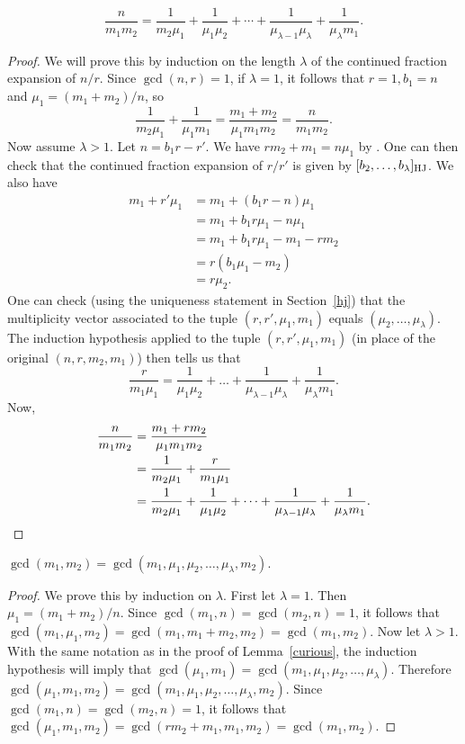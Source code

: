 \begin{lemma}\label{curious}
 \[ \frac{n}{m_1m_2} = \frac{1}{m_2 \mu_1} + \frac{1}{\mu_1 \mu_2} + \cdots + \frac{1}{\mu_{\lambda-1} \mu_\lambda} + \frac{1}{\mu_\lambda m_1} .\]
\end{lemma}
\begin{proof}
 We will prove this by induction on the length $\lambda$ of the continued fraction expansion of $n/r$. Since $\gcd(n,r) = 1$, if $\lambda = 1$, it follows that $r=1, b_1=n$ and $\mu_1 = (m_1+m_2)/n$, so
 \[ \frac{1}{m_2 \mu_1} + \frac{1}{\mu_1 m_1} = \frac{m_1+m_2}{\mu_1 m_1 m_2} = \frac{n}{m_1 m_2} .\]
 Now assume $\lambda > 1$. Let $n=b_1 r - r'$. We have $rm_2+m_1 = n \mu_1$ by \cite[Corollary~2.4.3]{ces}. One can then check that the continued fraction expansion of $r/r'$ is given by $[b_2,\ldots,b_{\lambda}]_{\textup{HJ}}$. 
 We also have 
 \begin{align*}
 m_1+r'\mu_1 &= m_1+(b_1r-n)\mu_1 \\
 &= m_1+b_1r\mu_1-n\mu_1 \\
 &= m_1+b_1r\mu_1-m_1-rm_2 \\
 &= r(b_1\mu_1-m_2) \\
 &= r\mu_2. 
 \end{align*}
 One can check (using the uniqueness statement in Section~\ref{hj}) that the multiplicity vector associated to the tuple $(r,r',\mu_1,m_1)$ equals $(\mu_2,\ldots,\mu_{\lambda})$. The induction hypothesis applied to the tuple $(r,r',\mu_1,m_1)$ (in place of the original $(n,r,m_2,m_1)$) then tells us that
 \[ \frac{r}{m_1 \mu_1} = \frac{1}{\mu_1 \mu_2} + \ldots + \frac{1}{\mu_{\lambda-1} \mu_\lambda} + \frac{1}{\mu_{\lambda} m_1} .\]
 Now,
 \begin{align*}
  \frac{n}{m_1 m_2} &= \frac{m_1+rm_2}{\mu_1 m_1 m_2} \\
  &= \frac{1}{m_2 \mu_1} + \frac{r}{m_1 \mu_1} \\
  &= \frac{1}{m_2 \mu_1} + \frac{1}{\mu_1 \mu_2} + \cdots + \frac{1}{\mu_{\lambda-1} \mu_\lambda} + \frac{1}{\mu_\lambda m_1} . \qedhere
 \end{align*}
\end{proof}

\begin{lemma}\label{gcdmult}
 $\gcd(m_1,m_2) = \gcd(m_1,\mu_1,\mu_2,\ldots,\mu_{\lambda},m_2).$
\end{lemma}
\begin{proof}
 We prove this by induction on $\lambda$. First let $\lambda = 1$. Then $\mu_1 = (m_1+m_2)/n$. Since $\gcd(m_1,n) = \gcd(m_2,n) = 1$, it follows that $\gcd(m_1,\mu_1,m_2) = \gcd(m_1,m_1+m_2,m_2) = \gcd(m_1,m_2)$. Now let $\lambda > 1$. With the same notation as in the proof of Lemma~\ref{curious}, the induction hypothesis will imply that $\gcd(\mu_1,m_1) = \gcd(m_1,\mu_1,\mu_2,\ldots,\mu_{\lambda})$. Therefore $\gcd(\mu_1,m_1,m_2) = \gcd(m_1,\mu_1,\mu_2,\ldots,\mu_{\lambda},m_2)$. Since $\gcd(m_1,n) = \gcd(m_2,n) = 1$, it follows that $\gcd(\mu_1,m_1,m_2) = \gcd(rm_2+m_1,m_1,m_2) = \gcd(m_1,m_2)$.
\end{proof}



